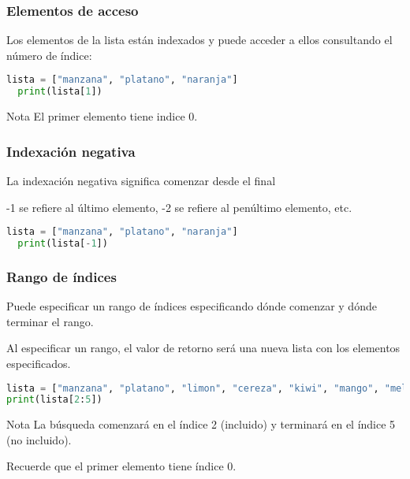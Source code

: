\begin{frame}[fragile]
  \frametitle{Elementos de acceso}

  Los elementos de la lista están indexados y puede acceder
  a ellos consultando el número de índice:

  \vspace{\baselineskip}
  \begin{lstlisting}[language=Python]
  lista = ["manzana", "platano", "naranja"]
  print(lista[1]) 
  \end{lstlisting}

  \begin{exampleblock}{Nota}
    El primer elemento tiene indice 0.
  \end{exampleblock}
\end{frame}

\begin{frame}[fragile]
  \frametitle{Indexación negativa}

  La indexación negativa significa comenzar desde el final

  \vspace{\baselineskip}
  -1 se refiere al último elemento, -2 se refiere al penúltimo elemento, etc.

  \vspace{\baselineskip}
  \begin{lstlisting}[language=Python]
  lista = ["manzana", "platano", "naranja"]
  print(lista[-1]) 
  \end{lstlisting}
\end{frame}

\begin{frame}[fragile]
  \frametitle{Rango de índices}

  Puede especificar un rango de índices especificando
  dónde comenzar y dónde terminar el rango.

  \vspace{\baselineskip}
  Al especificar un rango, el valor de retorno será una nueva
  lista con los elementos especificados.

  \vspace{\baselineskip}
  \begin{lstlisting}[language=Python]
lista = ["manzana", "platano", "limon", "cereza", "kiwi", "mango", "melon"]
print(lista[2:5]) 
  \end{lstlisting}

  \pausa
  \begin{alertblock}{Nota}
    La búsqueda comenzará en el índice 2 (incluido)
    y terminará en el índice 5 (no incluido). 

    Recuerde que el primer elemento tiene índice 0.
  \end{alertblock}
\end{frame}

